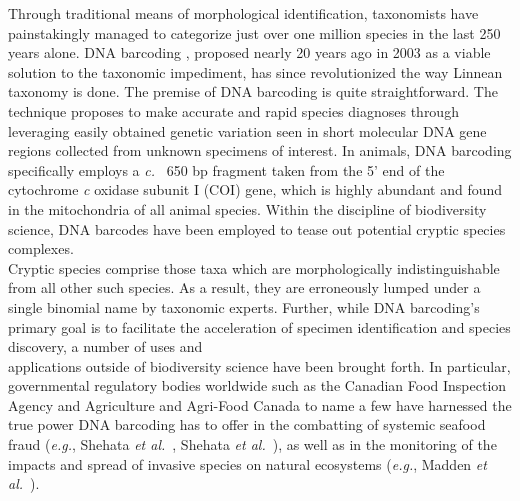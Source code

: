 Through traditional means of morphological identification, taxonomists have \\ painstakingly managed to categorize just over one million species in the last 250 years alone. DNA barcoding \cite{hebert2003biological, hebert2003barcoding}, proposed nearly 20 years ago in 2003 as a viable solution to the taxonomic impediment, has since revolutionized the way Linnean taxonomy is done. The premise of DNA barcoding is quite straightforward. The technique proposes to make accurate and rapid species diagnoses through leveraging easily obtained genetic variation seen in short molecular DNA gene regions collected from unknown specimens of interest. In animals, DNA barcoding specifically employs a \textit{c.}~ 650 bp fragment taken from the 5' end of the cytochrome \textit{c} oxidase subunit I (COI) gene, which is highly abundant and found in the mitochondria of all animal species. Within the discipline of biodiversity science, DNA barcodes have been employed to tease out potential cryptic species complexes. \\ Cryptic species comprise those taxa which are morphologically indistinguishable from all other such species. As a result, they are erroneously lumped under a single binomial name by taxonomic experts. Further, while DNA barcoding's primary goal is to facilitate the acceleration of specimen identification and species discovery, a number of uses and \\ applications outside of biodiversity science have been brought forth. In particular, \\ governmental regulatory bodies worldwide such as the Canadian Food Inspection Agency and Agriculture and Agri-Food Canada to name a few have harnessed the true power DNA barcoding has to offer in the combatting of systemic seafood fraud (\textit{e.g.}, Shehata \textit{et al.}~\cite{shehata2019survey}, Shehata \textit{et al.}~\cite{shehata2018dna}), as well as in the monitoring of the impacts and spread of invasive species on natural ecosystems (\textit{e.g.}, Madden \textit{et al.}~\cite{madden2019using}).



